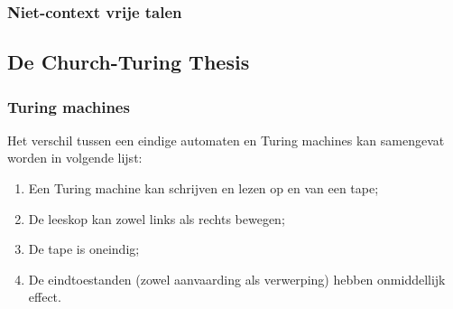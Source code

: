 \documentclass[12pt,a4paper]{article}
\theoremstyle{definition}
\begin{document}
	\subsubsection{Niet-context vrije talen}
	\subsection{De Church-Turing Thesis}
	\subsubsection{Turing machines}
	Het verschil tussen een eindige automaten en Turing machines kan samengevat worden in volgende lijst:\begin{enumerate}
		\item Een Turing machine kan schrijven en lezen op en van een tape;
		\item De leeskop kan zowel links als rechts bewegen;
		\item De tape is oneindig;
		\item De eindtoestanden (zowel aanvaarding als verwerping) hebben onmiddellijk effect.
	\end{enumerate}	
\end{document}
